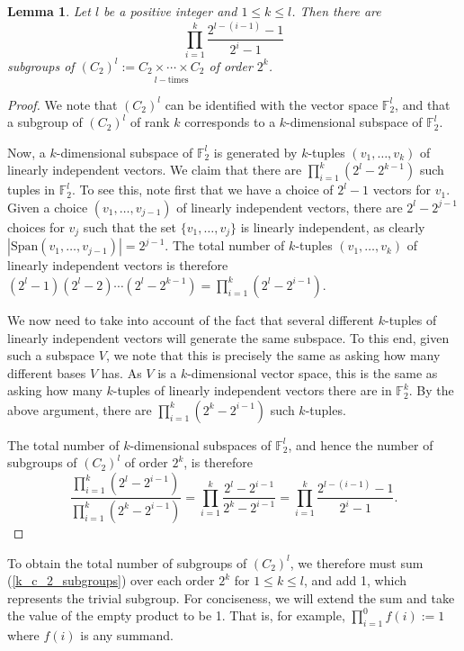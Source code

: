 \documentclass[a4paper,reqno]{amsart}
\newtheorem{lemma}[theorem]{Lemma}
\theoremstyle{definition}
\begin{document}
\begin{lemma}
    Let $l$ be a positive integer and $1 \leq k \leq l$. Then there are
    \begin{equation}\label{k_c_2_subgroups}
        \prod_{i=1}^k\frac{2^{l-(i-1)}-1}{2^i-1}
    \end{equation}
    subgroups of $(C_2)^l:=\underset{l -\text{times}}{C_2 \times \cdots \times C_2}$ of order $2^k$.
\end{lemma}
\begin{proof}
    We note that $(C_2)^l$ can be identified with the vector space $\mathbb{F}_2^l$, and that a subgroup of $(C_2)^l$ of rank $k$ corresponds to a $k$-dimensional subspace of $\mathbb{F}_2^l$.

    Now, a $k$-dimensional subspace of $\mathbb{F}_2^l$ is generated by $k$-tuples $(v_1,\ldots,v_k)$ of linearly independent vectors. We claim that there are $\prod_{i=1}^k(2^l-2^{k-1})$ such tuples in $\mathbb{F}_2^l$. To see this, note first that we have a choice of $2^l-1$ vectors for $v_1$. Given a choice $(v_1,\ldots,v_{j-1})$ of linearly independent vectors, there are $2^l-2^{j-1}$ choices for $v_j$ such that the set $\{v_1,\ldots,v_j\}$ is linearly independent, as clearly $|\mathrm{Span}(v_1,\ldots,v_{j-1})|=2^{j-1}$. The total number of $k$-tuples $(v_1,\ldots,v_k)$ of linearly independent vectors is therefore $(2^l-1)(2^l-2)\cdots(2^l-2^{k-1})=\prod_{i=1}^k(2^l-2^{i-1})$.

    We now need to take into account of the fact that several different $k$-tuples of linearly independent vectors will generate the same subspace. To this end, given such a subspace $V$, we note that this is precisely the same as asking how many different bases $V$ has. As $V$ is a $k$-dimensional vector space, this is the same as asking how many $k$-tuples of linearly independent vectors there are in $\mathbb{F}_2^k$. By the above argument, there are $\prod_{i=1}^k(2^k-2^{i-1})$ such $k$-tuples.

    The total number of $k$-dimensional subspaces of $\mathbb{F}_2^l$, and hence the number of subgroups of $(C_2)^l$ of order $2^k$, is therefore
    \[\frac{\prod_{i=1}^k(2^l-2^{i-1})}{\prod_{i=1}^k(2^k-2^{i-1})}=\prod_{i=1}^k\frac{2^l-2^{i-1}}{2^k-2^{i-1}}=\prod_{i=1}^k\frac{2^{l-(i-1)}-1}{2^i-1}.\]
\end{proof}
To obtain the total number of subgroups of $(C_2)^l$, we therefore must sum (\ref{k_c_2_subgroups}) over each order $2^k$ for $1 \leq k \leq l$, and add 1, which represents the trivial subgroup. For conciseness, we will extend the sum and take the value of the empty product to be 1. That is, for example, $\prod_{i=1}^0f(i):=1$ where $f(i)$ is any summand.
\end{document}
